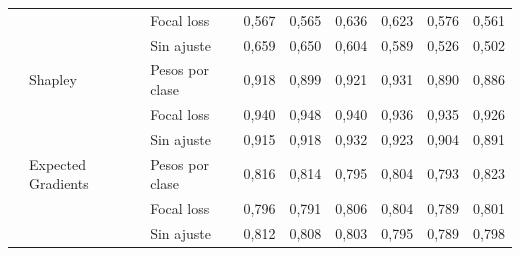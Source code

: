 \begin{tabular}{lllcccccc}
 &  & Focal loss & 0{,}567 & 0{,}565 & 0{,}636 & 0{,}623 & 0{,}576 & 0{,}561 \\
 &  & Sin ajuste & 0{,}659 & 0{,}650 & 0{,}604 & 0{,}589 & 0{,}526 & 0{,}502 \\
 & Shapley & Pesos por clase & 0{,}918 & 0{,}899 & 0{,}921 & 0{,}931 & 0{,}890 & 0{,}886 \\
 &  & Focal loss & 0{,}940 & 0{,}948 & 0{,}940 & 0{,}936 & 0{,}935 & 0{,}926 \\
 &  & Sin ajuste & 0{,}915 & 0{,}918 & 0{,}932 & 0{,}923 & 0{,}904 & 0{,}891 \\
 & Expected Gradients & Pesos por clase & 0{,}816 & 0{,}814 & 0{,}795 & 0{,}804 & 0{,}793 & 0{,}823 \\
 &  & Focal loss & 0{,}796 & 0{,}791 & 0{,}806 & 0{,}804 & 0{,}789 & 0{,}801 \\
 &  & Sin ajuste & 0{,}812 & 0{,}808 & 0{,}803 & 0{,}795 & 0{,}789 & 0{,}798 \\
\bottomrule
\end{tabular}
